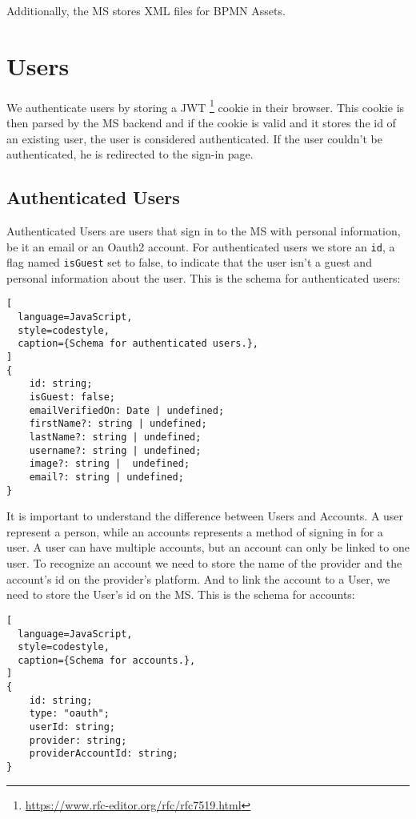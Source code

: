 Additionally, the MS stores XML files for BPMN Assets.

\section{Users}

We authenticate users by storing a JWT
\footnote{\url{https://www.rfc-editor.org/rfc/rfc7519.html}} cookie in their browser.
This cookie is then parsed by the MS backend and if the cookie is valid and it stores the
id of an existing user, the user is considered authenticated.
If the user couldn't be authenticated, he is redirected to the sign-in page.

\subsection{Authenticated Users}

Authenticated Users are users that sign in to the MS with personal information, be
it an email or an Oauth2 account.
For authenticated users we store an \lstinline{id}, a flag named \lstinline{isGuest} set
to false, to indicate that the user isn't a guest and personal information about the user.
This is the schema for authenticated users:

\begin{lstlisting}[
  language=JavaScript,
  style=codestyle,
  caption={Schema for authenticated users.},
]
{
    id: string;
    isGuest: false;
    emailVerifiedOn: Date | undefined;
    firstName?: string | undefined;
    lastName?: string | undefined;
    username?: string | undefined;
    image?: string |  undefined;
    email?: string | undefined;
}
\end{lstlisting}

It is important to understand the difference between Users and Accounts.
A user represent a person, while an accounts represents a method of signing in for a user.
A user can have multiple accounts, but an account can only be linked to one user.
To recognize an account we need to store the name of the provider and the account's
id on the provider's platform.
And to link the account to a User, we need to store the User's id on the MS.
This is the schema for accounts:

\begin{lstlisting}[
  language=JavaScript,
  style=codestyle,
  caption={Schema for accounts.},
]
{
    id: string;
    type: "oauth";
    userId: string;
    provider: string;
    providerAccountId: string;
}
\end{lstlisting}

